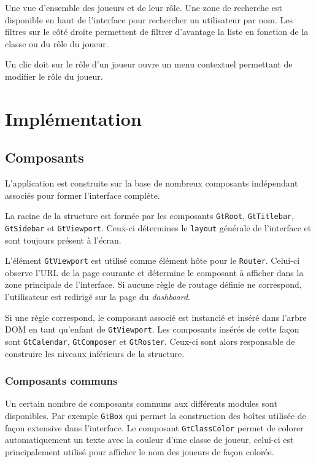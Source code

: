 	Une vue d'ensemble des joueurs et de leur rôle. Une zone de recherche est disponible en haut de l'interface pour rechercher un utilisateur par nom. Les filtres sur le côté droite permettent de filtrer d'avantage la liste en fonction de la classe ou du rôle du joueur.
	
	Un clic doit sur le rôle d'un joueur ouvre un menu contextuel permettant de modifier le rôle du joueur.
	
\section{Implémentation}

	\subsection{Composants}
	
	L'application est construite sur la base de nombreux composants indépendant associés pour former l'interface complète.
	
	La racine de la structure est formée par les composants \texttt{GtRoot}, \texttt{GtTitlebar}, \texttt{GtSidebar} et \texttt{GtViewport}. Ceux-ci détermines le \texttt{layout} générale de l'interface et sont toujours présent à l'écran.
	
	L'élément \texttt{GtViewport} est utilisé comme élément hôte pour le \texttt{Router}. Celui-ci observe l'URL de la page courante et détermine le composant à afficher dans la zone principale de l'interface. Si aucune règle de routage définie ne correspond, l'utilisateur est redirigé sur la page du \emph{dashboard}.
	
	Si une règle correspond, le composant associé est instancié et inséré dans l'arbre DOM en tant qu'enfant de \texttt{GtViewport}. Les composants insérés de cette façon sont \texttt{GtCalendar}, \texttt{GtComposer} et \texttt{GtRoster}. Ceux-ci sont alors responsable de construire les niveaux inférieurs de la structure.
	
	\subsubsection{Composants communs}
	
	Un certain nombre de composants communs aux différents modules sont disponibles. Par exemple \texttt{GtBox} qui permet la construction des boîtes utilisée de façon extensive dans l'interface. Le composant \texttt{GtClassColor} permet de colorer automatiquement un texte avec la couleur d'une classe de joueur, celui-ci est principalement utilisé pour afficher le nom des joueurs de façon colorée.
	
